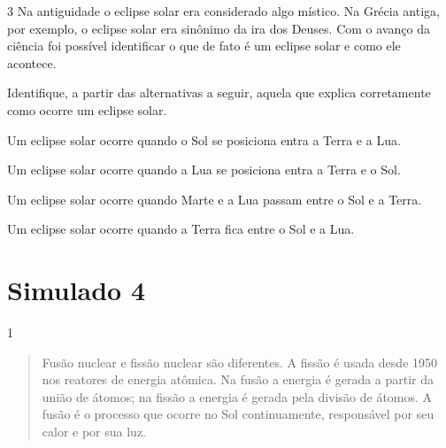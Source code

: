 \num{3}
  Na antiguidade o eclipse solar era considerado algo místico. Na Grécia
  antiga, por exemplo, o eclipse solar era sinônimo da ira dos Deuses.
  Com o avanço da ciência foi possível identificar o que de fato é um
  eclipse solar e como ele acontece.


Identifique, a partir das alternativas a seguir, aquela que explica
corretamente como ocorre um eclipse solar.

\begin{escolha}
\item
  Um eclipse solar ocorre quando o Sol se posiciona entra a Terra e a Lua.
\item
  Um eclipse solar ocorre quando a Lua se posiciona entra a Terra e o Sol.
\item
  Um eclipse solar ocorre quando Marte e a Lua passam entre o Sol e a Terra.
\item
  Um eclipse solar ocorre quando a Terra fica entre o Sol e a Lua.
\end{escolha}


\chapter{Simulado 4}

\num{1}
\begin{quote}
  Fusão nuclear e fissão nuclear são diferentes. A fissão é usada desde 1950 nos reatores de energia
  atômica. Na fusão a energia é gerada a partir da união de átomos; na fissão a energia é gerada pela divisão de átomos. A fusão
  é o processo que ocorre no Sol continuamente, responsável por seu
  calor e por sua luz.

\end{quote}

